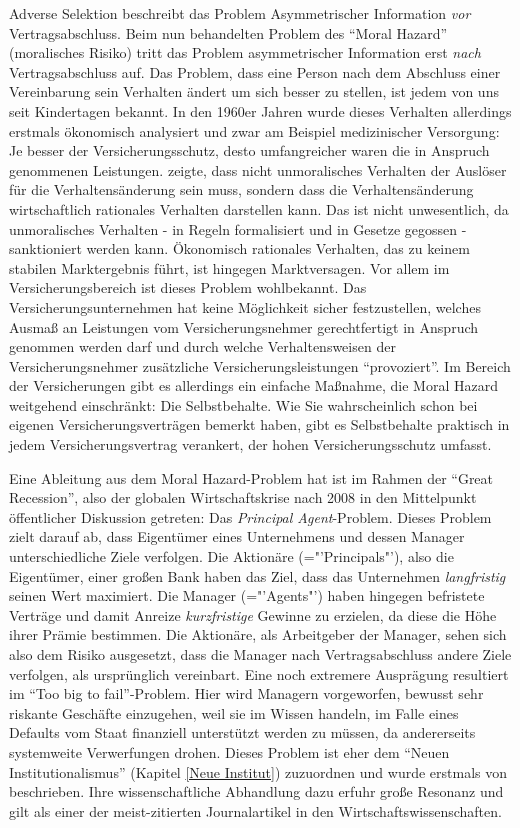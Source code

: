 Adverse Selektion beschreibt das Problem Asymmetrischer Information \textit{vor} Vertragsabschluss. Beim nun behandelten Problem des "`Moral Hazard"' (moralisches Risiko) tritt das Problem asymmetrischer Information erst \textit{nach} Vertragsabschluss auf. Das Problem, dass eine Person nach dem Abschluss einer Vereinbarung sein Verhalten ändert um sich besser zu stellen, ist jedem von uns seit Kindertagen bekannt. In den 1960er Jahren wurde dieses Verhalten allerdings erstmals ökonomisch analysiert \parencite{Arrow1963, Dickerson1963} und zwar am Beispiel medizinischer Versorgung: Je besser der Versicherungsschutz, desto umfangreicher waren die in Anspruch genommenen Leistungen. \textcite{Pauly1968} zeigte, dass nicht unmoralisches Verhalten der Auslöser für die Verhaltensänderung sein muss, sondern dass die Verhaltensänderung wirtschaftlich rationales Verhalten darstellen kann. Das ist nicht unwesentlich, da unmoralisches Verhalten - in Regeln formalisiert und in Gesetze gegossen - sanktioniert werden kann. Ökonomisch rationales Verhalten, das zu keinem stabilen Marktergebnis führt, ist hingegen Marktversagen. Vor allem im Versicherungsbereich ist dieses Problem wohlbekannt. Das Versicherungsunternehmen hat keine Möglichkeit sicher festzustellen, welches Ausmaß an Leistungen vom Versicherungsnehmer gerechtfertigt in Anspruch genommen werden darf und durch welche Verhaltensweisen der Versicherungsnehmer zusätzliche Versicherungsleistungen "`provoziert"'. Im Bereich der Versicherungen gibt es allerdings ein einfache Maßnahme, die Moral Hazard weitgehend einschränkt: Die Selbstbehalte. Wie Sie wahrscheinlich schon bei eigenen Versicherungsverträgen bemerkt haben, gibt es Selbstbehalte praktisch in jedem Versicherungsvertrag verankert, der hohen Versicherungsschutz umfasst.

Eine Ableitung aus dem Moral Hazard-Problem hat ist im Rahmen der "`Great Recession"', also der globalen Wirtschaftskrise nach 2008 in den Mittelpunkt öffentlicher Diskussion getreten: Das \textit{Principal Agent}-Problem. Dieses Problem zielt darauf ab, dass Eigentümer eines Unternehmens und dessen Manager unterschiedliche Ziele verfolgen. Die Aktionäre (="'Principals"'), also die Eigentümer, einer großen Bank haben das Ziel, dass das Unternehmen \textit{langfristig} seinen Wert maximiert. Die Manager (="'Agents"') haben hingegen befristete Verträge und damit Anreize \textit{kurzfristige} Gewinne zu erzielen, da diese die Höhe ihrer Prämie bestimmen. Die Aktionäre, als Arbeitgeber der Manager, sehen sich also dem Risiko ausgesetzt, dass die Manager nach Vertragsabschluss andere Ziele verfolgen, als ursprünglich vereinbart. Eine noch extremere Ausprägung resultiert im "`Too big to fail"'-Problem. Hier wird Managern vorgeworfen, bewusst sehr riskante Geschäfte einzugehen, weil sie im Wissen handeln, im Falle eines Defaults vom Staat finanziell unterstützt werden zu müssen, da andererseits systemweite Verwerfungen drohen. Dieses Problem ist eher dem "`Neuen Institutionalismus"' (Kapitel \ref{Neue Institut}) zuzuordnen und wurde erstmals von \textcite{Jensen1976} beschrieben. Ihre wissenschaftliche Abhandlung dazu erfuhr große Resonanz und gilt als einer der meist-zitierten Journalartikel in den Wirtschaftswissenschaften.


